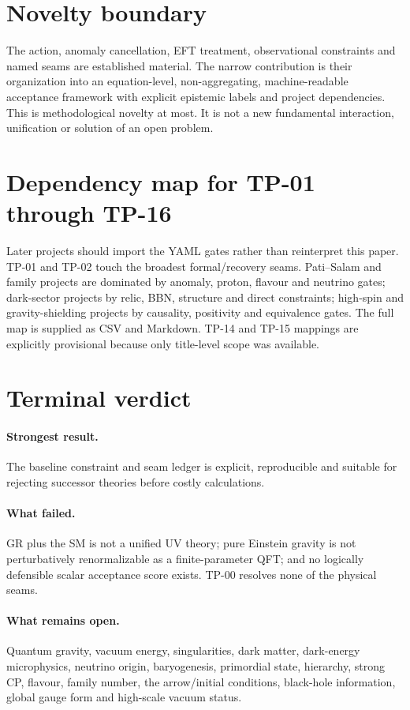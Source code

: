 \documentclass[11pt,a4paper]{article}
\begin{document}
\section{Novelty boundary}
The action, anomaly cancellation, EFT treatment, observational constraints and named seams are established material.  The narrow contribution is their organization into an equation-level, non-aggregating, machine-readable acceptance framework with explicit epistemic labels and project dependencies.  This is methodological novelty at most.  It is not a new fundamental interaction, unification or solution of an open problem.

\section{Dependency map for TP-01 through TP-16}
Later projects should import the YAML gates rather than reinterpret this paper.  TP-01 and TP-02 touch the broadest formal/recovery seams.  Pati--Salam and family projects are dominated by anomaly, proton, flavour and neutrino gates; dark-sector projects by relic, BBN, structure and direct constraints; high-spin and gravity-shielding projects by causality, positivity and equivalence gates.  The full map is supplied as CSV and Markdown.  TP-14 and TP-15 mappings are explicitly provisional because only title-level scope was available.

\section{Terminal verdict}
\paragraph{Strongest result.}  The baseline constraint and seam ledger is explicit, reproducible and suitable for rejecting successor theories before costly calculations.

\paragraph{What failed.}  GR plus the SM is not a unified UV theory; pure Einstein gravity is not perturbatively renormalizable as a finite-parameter QFT; and no logically defensible scalar acceptance score exists.  TP-00 resolves none of the physical seams.

\paragraph{What remains open.}  Quantum gravity, vacuum energy, singularities, dark matter, dark-energy microphysics, neutrino origin, baryogenesis, primordial state, hierarchy, strong CP, flavour, family number, the arrow/initial conditions, black-hole information, global gauge form and high-scale vacuum status.
\end{document}
